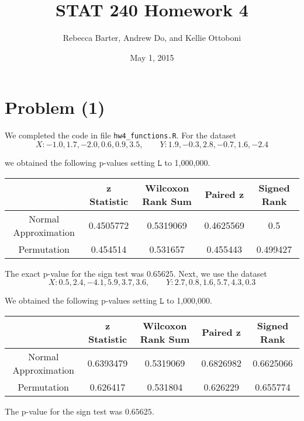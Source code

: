 \documentclass[11pt]{article}
\title{STAT 240 Homework 4}
\author{Rebecca Barter, Andrew Do, and Kellie Ottoboni}
\date{May 1, 2015} %
\begin{document}
\maketitle


\section*{Problem (1)}
We completed the code in file \texttt{hw4\_functions.R}.  For the dataset 
$$X: -1.0, 1.7, -2.0, 0.6, 0.9, 3.5, \qquad Y : 1.9, -0.3, 2.8, -0.7, 1.6, -2.4$$

we obtained the following p-values setting $\texttt{L}$ to 1,000,000.
\begin{table}[htdp]
\begin{center}
\begin{tabular}{|c|c|c|c|c|}
\hline
 & z Statistic & Wilcoxon Rank Sum & Paired z & Signed Rank  \\ \hline
Normal Approximation & 0.4505772 & 0.5319069 & 0.4625569 & 0.5   \\
Permutation & 0.454514 & 0.531657 & 0.455443 & 0.499427  \\ \hline
\end{tabular}
\end{center}
\label{default}
\end{table}%
 The exact p-value for the sign test was $0.65625$.  Next, we use the dataset 
$$X: 0.5, 2.4, -4.1, 5.9, 3.7, 3.6, \qquad Y : 2.7, 0.8, 1.6, 5.7, 4.3, 0.3$$

We obtained the following p-values setting $\texttt{L}$ to 1,000,000.
\begin{table}[htdp]
\begin{center}
\begin{tabular}{|c|c|c|c|c|}
\hline
 & z Statistic & Wilcoxon Rank Sum & Paired z & Signed Rank  \\ \hline
Normal Approximation & 0.6393479 & 0.5319069 & 0.6826982 & 0.6625066   \\
Permutation & 0.626417 &  0.531804 & 0.626229 & 0.655774  \\ \hline
\end{tabular}
\end{center}
\label{default}
\end{table}%

The p-value for the sign test was $ 0.65625$.
\end{document}
